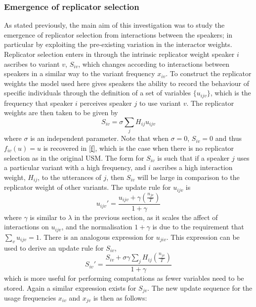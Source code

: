 \documentclass[12pt]{article}
\begin{document}
\subsubsection{Emergence of replicator selection}
As stated previously, the main aim of this investigation was to study the emergence of replicator selection from interactions between the speakers; in particular by exploiting the pre-existing variation in the interactor weights. Replicator selection enters in through the intrinsic replicator weight speaker $i$ ascribes to variant $v$, $S_{iv}$, which changes according to interactions between speakers in a similar way to the variant frequency $x_{iv}$. To construct the replicator weights the model used here gives speakers the ability to record the behaviour of specific individuals through the definition of a set of variables $\{u_{ijv}\}$, which is the frequency that speaker $i$ perceives speaker $j$ to use variant $v$. The replicator weights are then taken to be given by
\begin{equation}
S_{iv} = \sigma \sum\limits_{j} H_{ij}u_{ijv}
\end{equation}
where $\sigma$ is an independent parameter. Note that when $\sigma = 0 $, $S_{iv} = 0$ and thus $f_{iv}(u) = u$ is recovered in \ref{f}, which is the case when there is no replicator selection as in the original USM. The form for $S_{iv}$ is such that if a speaker $j$ uses a particular variant with a high frequency, and $i$ ascribes a high interaction weight, $H_{ij}$, to the utterances of $j$, then $S_{iv}$ will be large in comparison to the replicator weight of other variants. The update rule for $u_{ijv}$ is
\begin{equation}\label{u}
u_{ijv}' = \frac{u_{ijv} + \gamma (\frac{n_{jv}}{T})}{1 + \gamma}
\end{equation}
where $\gamma$ is similar to $\lambda$ in the previous section, as it scales the affect of interactions on $u_{ijv}$, and the normalisation $1 + \gamma$ is due to the requirement that $\sum\limits_{v} u_{ijv} = 1$. There is an analogous expression for $u_{jiv}$. This expression can be used to derive an update rule for $S_{iv}$, 
\begin{equation}\label{S}
S_{iv}' = \frac{S_{iv} + \sigma \gamma \sum\limits_{j} H_{ij}(\frac{n_{jv}}{T})}{1 + \gamma}
\end{equation}
which is more useful for performing computations as fewer variables need to be stored. Again a similar expression exists for $S_{jv}$. The new update sequence for the usage frequencies $x_{iv}$ and $x_{jv}$ is then as follows:
\end{document}
